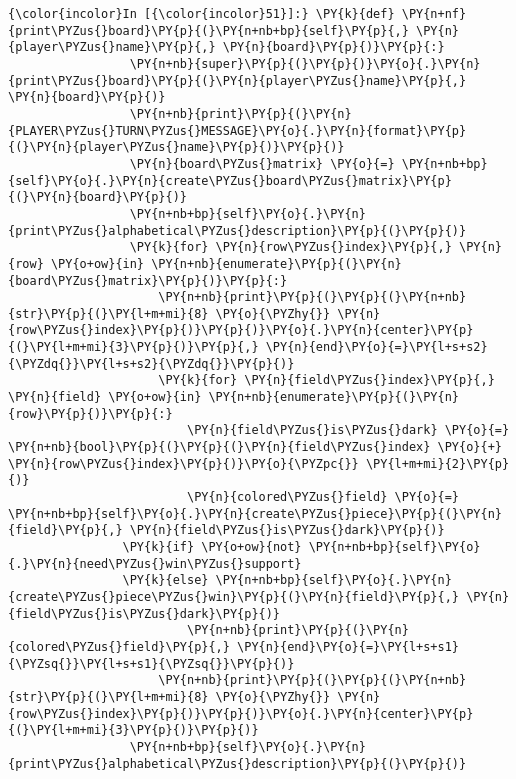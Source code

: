     \begin{Verbatim}[commandchars=\\\{\}]
{\color{incolor}In [{\color{incolor}51}]:} \PY{k}{def} \PY{n+nf}{print\PYZus{}board}\PY{p}{(}\PY{n+nb+bp}{self}\PY{p}{,} \PY{n}{player\PYZus{}name}\PY{p}{,} \PY{n}{board}\PY{p}{)}\PY{p}{:}
                 \PY{n+nb}{super}\PY{p}{(}\PY{p}{)}\PY{o}{.}\PY{n}{print\PYZus{}board}\PY{p}{(}\PY{n}{player\PYZus{}name}\PY{p}{,} \PY{n}{board}\PY{p}{)}
                 \PY{n+nb}{print}\PY{p}{(}\PY{n}{PLAYER\PYZus{}TURN\PYZus{}MESSAGE}\PY{o}{.}\PY{n}{format}\PY{p}{(}\PY{n}{player\PYZus{}name}\PY{p}{)}\PY{p}{)}
                 \PY{n}{board\PYZus{}matrix} \PY{o}{=} \PY{n+nb+bp}{self}\PY{o}{.}\PY{n}{create\PYZus{}board\PYZus{}matrix}\PY{p}{(}\PY{n}{board}\PY{p}{)}
                 \PY{n+nb+bp}{self}\PY{o}{.}\PY{n}{print\PYZus{}alphabetical\PYZus{}description}\PY{p}{(}\PY{p}{)}
                 \PY{k}{for} \PY{n}{row\PYZus{}index}\PY{p}{,} \PY{n}{row} \PY{o+ow}{in} \PY{n+nb}{enumerate}\PY{p}{(}\PY{n}{board\PYZus{}matrix}\PY{p}{)}\PY{p}{:}
                     \PY{n+nb}{print}\PY{p}{(}\PY{p}{(}\PY{n+nb}{str}\PY{p}{(}\PY{l+m+mi}{8} \PY{o}{\PYZhy{}} \PY{n}{row\PYZus{}index}\PY{p}{)}\PY{p}{)}\PY{o}{.}\PY{n}{center}\PY{p}{(}\PY{l+m+mi}{3}\PY{p}{)}\PY{p}{,} \PY{n}{end}\PY{o}{=}\PY{l+s+s2}{\PYZdq{}}\PY{l+s+s2}{\PYZdq{}}\PY{p}{)}
                     \PY{k}{for} \PY{n}{field\PYZus{}index}\PY{p}{,} \PY{n}{field} \PY{o+ow}{in} \PY{n+nb}{enumerate}\PY{p}{(}\PY{n}{row}\PY{p}{)}\PY{p}{:}
                         \PY{n}{field\PYZus{}is\PYZus{}dark} \PY{o}{=} \PY{n+nb}{bool}\PY{p}{(}\PY{p}{(}\PY{n}{field\PYZus{}index} \PY{o}{+} \PY{n}{row\PYZus{}index}\PY{p}{)}\PY{o}{\PYZpc{}} \PY{l+m+mi}{2}\PY{p}{)}
                         \PY{n}{colored\PYZus{}field} \PY{o}{=} \PY{n+nb+bp}{self}\PY{o}{.}\PY{n}{create\PYZus{}piece}\PY{p}{(}\PY{n}{field}\PY{p}{,} \PY{n}{field\PYZus{}is\PYZus{}dark}\PY{p}{)} 
				\PY{k}{if} \PY{o+ow}{not} \PY{n+nb+bp}{self}\PY{o}{.}\PY{n}{need\PYZus{}win\PYZus{}support} 
				\PY{k}{else} \PY{n+nb+bp}{self}\PY{o}{.}\PY{n}{create\PYZus{}piece\PYZus{}win}\PY{p}{(}\PY{n}{field}\PY{p}{,} \PY{n}{field\PYZus{}is\PYZus{}dark}\PY{p}{)}
                         \PY{n+nb}{print}\PY{p}{(}\PY{n}{colored\PYZus{}field}\PY{p}{,} \PY{n}{end}\PY{o}{=}\PY{l+s+s1}{\PYZsq{}}\PY{l+s+s1}{\PYZsq{}}\PY{p}{)}
                     \PY{n+nb}{print}\PY{p}{(}\PY{p}{(}\PY{n+nb}{str}\PY{p}{(}\PY{l+m+mi}{8} \PY{o}{\PYZhy{}} \PY{n}{row\PYZus{}index}\PY{p}{)}\PY{p}{)}\PY{o}{.}\PY{n}{center}\PY{p}{(}\PY{l+m+mi}{3}\PY{p}{)}\PY{p}{)}
                 \PY{n+nb+bp}{self}\PY{o}{.}\PY{n}{print\PYZus{}alphabetical\PYZus{}description}\PY{p}{(}\PY{p}{)}
\end{Verbatim}
